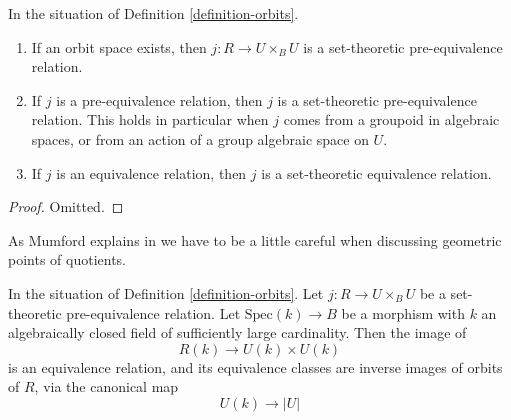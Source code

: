 \begin{lemma}
\label{lemma-orbits}
In the situation of Definition \ref{definition-orbits}.
\begin{enumerate}
\item If an orbit space exists, then $j : R \to U \times_B U$
is a set-theoretic pre-equivalence relation.
\item If $j$ is a pre-equivalence relation, then $j$ is a
set-theoretic pre-equivalence relation. This holds in particular
when $j$ comes from a groupoid in algebraic spaces, or from an
action of a group algebraic space on $U$.
\item If $j$ is an equivalence relation, then $j$ is a
set-theoretic equivalence relation.
\end{enumerate}
\end{lemma}

\begin{proof}
Omitted.
\end{proof}

\noindent
As Mumford explains in \cite[Definition 0.6]{GIT} we have to be a little
careful when discussing geometric points of quotients. 

\begin{lemma}
\label{lemma-orbit-geometric}
In the situation of Definition \ref{definition-orbits}.
Let $j : R \to U \times_B U$ be a set-theoretic pre-equivalence relation.
Let $\text{Spec}(k) \to B$ be a morphism with $k$ an algebraically closed field
of sufficiently large cardinality.
Then the image of
$$
R(k) \longrightarrow U(k) \times U(k)
$$
is an equivalence relation, and its equivalence classes are inverse
images of orbits of $R$, via the canonical map
$$
U(k) \longrightarrow |U|
$$
\end{lemma}

